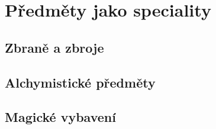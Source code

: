 \chapter{Předměty jako speciality}
\label{chap:magicke-spec-predmety}

\section{Zbraně a zbroje}
\label{sec:zbrane-zbroje}

\section{Alchymistické předměty}
\label{sec:alchymisticke-predmety}

\section{Magické vybavení}
\label{sec:magicke-vybaveni}





